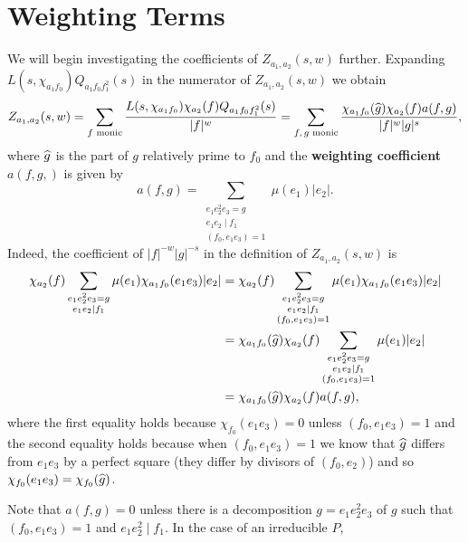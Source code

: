 \documentclass[12pt,reqno,oneside]{amsart}
\begin{document}
\section{Weighting Terms}
    We will begin investigating the coefficients of $Z_{a_{1},a_{2}}(s,w)$ further. Expanding $L(s,\chi_{a_{1}f_{0}})Q_{a_{1}f_{0}f_{1}^{2}}(s)$ in the numerator of $Z_{a_{1},a_{2}}(s,w)$ we obtain
    \[
        Z_{a_{1},a_{2}}(s,w) = \sum_{\text{$f$ monic}}\frac{L(s,\chi_{a_{1}f_{0}})\chi_{a_{2}}(f)Q_{a_{1}f_{0}f_{1}^{2}}(s)}{|f|^{w}} = \sum_{\text{$f,g$ monic}}\frac{\chi_{a_{1}f_{0}}(\widehat{g})\chi_{a_{2}}(f)a(f,g)}{|f|^{w}|g|^{s}},
    \]
    where $\widehat{g}$ is the part of $g$ relatively prime to $f_{0}$ and the \textbf{weighting coefficient} $a(f,g,)$ is given by
    \[
        a(f,g) = \sum_{\substack{e_{1}e_{2}^{2}e_{3} = g \\ e_{1}e_{2} \mid f_{1} \\ (f_{0},e_{1}e_{3}) = 1}}\mu(e_{1})|e_{2}|.
    \]
    Indeed, the coefficient of $|f|^{-w}|g|^{-s}$ in the definition of $Z_{a_{1},a_{2}}(s,w)$ is
    \begin{align*}
        \chi_{a_{2}}(f)\sum_{\substack{e_{1}e_{2}^{2}e_{3} = g \\ e_{1}e_{2} \mid f_{1}}}\mu(e_{1})\chi_{a_{1}f_{0}}(e_{1}e_{3})|e_{2}| &= \chi_{a_{2}}(f)\sum_{\substack{e_{1}e_{2}^{2}e_{3} = g \\ e_{1}e_{2} \mid f_{1} \\ (f_{0},e_{1}e_{3}) = 1}}\mu(e_{1})\chi_{a_{1}f_{0}}(e_{1}e_{3})|e_{2}| \\
        &= \chi_{a_{1}f_{0}}(\widehat{g})\chi_{a_{2}}(f)\sum_{\substack{e_{1}e_{2}^{2}e_{3} = g \\ e_{1}e_{2} \mid f_{1} \\ (f_{0},e_{1}e_{3}) = 1}}\mu(e_{1})|e_{2}| \\
        &= \chi_{a_{1}f_{0}}(\widehat{g})\chi_{a_{2}}(f)a(f,g),
    \end{align*}
    where the first equality holds because $\chi_{f_{0}}(e_{1}e_{3}) = 0$ unless $(f_{0},e_{1}e_{3}) = 1$ and the second equality holds because when $(f_{0},e_{1}e_{3}) = 1$ we know that $\widehat{g}$ differs from $e_{1}e_{3}$ by a perfect square (they differ by divisors of $(f_{0},e_{2})$) and so $\chi_{f_{0}}(e_{1}e_{3}) = \chi_{f_{0}}(\widehat{g})$. 
    
    \begin{remark}\label{rem:weighting_coefficient_remark}
        Note that $a(f,g) = 0$ unless there is a decomposition $g = e_{1}e_{2}^{2}e_{3}$ of $g$ such that $(f_{0},e_{1}e_{3}) = 1$ and $e_{1}e_{2}^{2} \mid f_{1}$. In the case of an irreducible $P$, 
    \end{remark}
\end{document}
